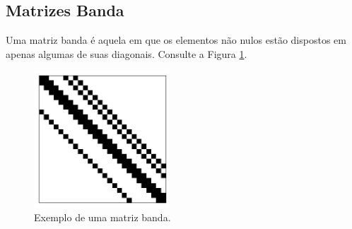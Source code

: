 \subsection{Matrizes Banda}

Uma matriz banda é aquela em que os elementos não nulos estão dispostos em apenas algumas de suas diagonais. Consulte a Figura \ref{fig:MatrizBanda}.

\begin{figure}[H]
  \centering
  \includegraphics[width=0.45\textwidth]{./cap_sislin/dados/figMatrizBanda/main}
  \caption{Exemplo de uma matriz banda.}
  \label{fig:MatrizBanda}
\end{figure}

